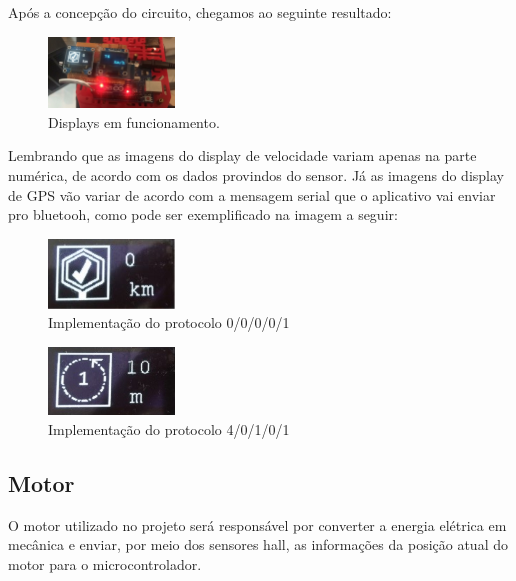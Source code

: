 	Após a concepção do circuito, chegamos ao seguinte resultado:

	\graphicspath{{figuras/}}
	\begin{figure}[H]
		\centering
		\includegraphics[width=0.3\textwidth, angle=90]{embarcado7.jpg}
		\caption{Displays em funcionamento.}
		\label{img:embarcado7}
	\end{figure}

	Lembrando que as imagens do display de velocidade variam apenas na parte numérica, de acordo com os dados provindos do sensor. Já as imagens do display de GPS vão variar de acordo com a mensagem serial que o aplicativo vai enviar pro bluetooh, como pode ser exemplificado na imagem a seguir:

	\graphicspath{{figuras/}}
	\begin{figure}[H]
		\centering
		\includegraphics[width=0.3\textwidth]{embarcado8.jpg}
		\caption{Implementação do protocolo 0/0/0/0/1}
		\label{img:embarcado8}
	\end{figure}

	\graphicspath{{figuras/}}
	\begin{figure}[H]
		\centering
		\includegraphics[width=0.3\textwidth]{embarcado9.jpg}
		\caption{Implementação do protocolo 4/0/1/0/1}
		\label{img:embarcado9}
	\end{figure}
	\subsection{Motor}
	O motor utilizado no projeto será responsável por converter a energia elétrica em mecânica e enviar, por meio dos sensores hall, as informações da posição atual do motor para o microcontrolador.
	
